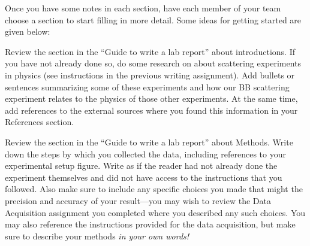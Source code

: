 \documentclass[11pt]{article}
\begin{document}
\vspace{1mm}

\noindent Once you have some notes in each section, have each member of your team choose a section to start filling in more detail. Some ideas for getting started are given below:

\vspace{5mm}



\vspace{3mm}

Review the section in the ``Guide to write a lab report'' about introductions. If you have not already done so, do some research on about scattering experiments in physics (see instructions in the previous writing assignment). Add bullets or sentences summarizing some of these experiments and how our BB scattering experiment relates to the physics of those other experiments. At the same time, add references to the external sources where you found this information in your References section.



\vspace{3mm}

Review the section in the ``Guide to write a lab report'' about Methods. Write down the steps by which you collected the data, including references to your experimental setup figure. Write as if the reader had not already done the experiment themselves and did not have access to the instructions that you followed. Also make sure to include any specific choices you made that might the precision and accuracy of your result---you may wish to review the Data Acquisition assignment you completed where you described any such choices. You may also reference the instructions provided for the data acquisition, but make sure to describe your methods \textit{in your own words!}


\vspace{5mm}
\end{document}
